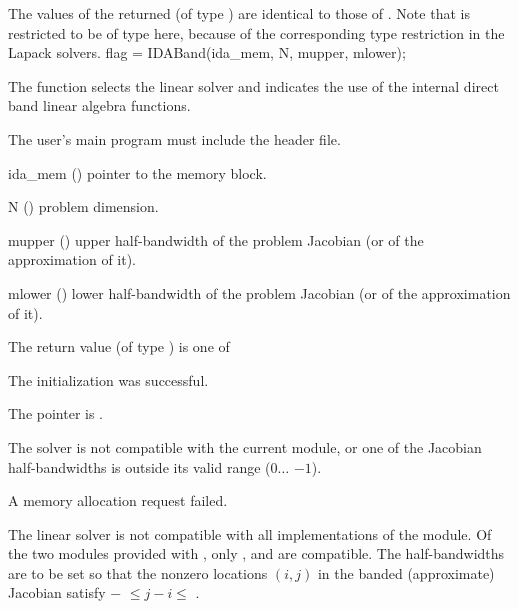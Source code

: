 {
  The values of the returned  (of type ) are identical
  to those of .
}
{
  Note that  is restricted to be of type  here, because
  of the corresponding type restriction in the Lapack solvers.
}
{
  flag = IDABand(ida\_mem, N, mupper, mlower);
}
{
  The function  selects the {\idaband} linear solver and indicates
  the use of the internal direct band linear algebra functions.

  The user's main program must include the  header file.
}
{
  \begin{args}
  \item[ida\_mem] ()
    pointer to the {\ida} memory block.
  \item[N] ()
    problem dimension.
  \item[mupper] ()
    upper half-bandwidth of the problem Jacobian (or of the approximation of it).
  \item[mlower] ()
    lower half-bandwidth of the problem Jacobian (or of the approximation of it).
  \end{args}
}
{
  The return value  (of type ) is one of
  \begin{args}
  \item[\Id{IDABAND\_SUCCESS}] 
    The {\idaband} initialization was successful.
  \item[\Id{IDABAND\_MEM\_NULL}]
    The  pointer is .
  \item[\Id{IDABAND\_ILL\_INPUT}]
    The {\idaband} solver is not compatible with the current {\nvector} module, or
    one of the Jacobian half-bandwidths is outside its valid range ($0 \ldots$
    $-1$).
  \item[\Id{IDABAND\_MEM\_FAIL}]
    A memory allocation request failed.
  \end{args}
}
{
  The {\idaband} linear solver is not compatible with all
  implementations of the {\nvector} module. Of the two {\nvector} modules 
  provided with {\sundials}, only {\nvecs}, {\nvecopenmp} and
  {\nvecpthreads} are compatible.
  The half-bandwidths are to be set so that the nonzero locations $(i,j)$ in the
  banded (approximate) Jacobian satisfy $-$ $\leq j-i \leq$ .
}
